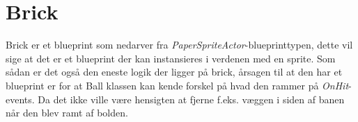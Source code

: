 \section{Brick}
Brick er et blueprint som nedarver fra \textit{PaperSpriteActor}-blueprinttypen, dette vil sige at det er et blueprint der kan instansieres i verdenen med en sprite. Som sådan er det også den eneste logik der ligger på brick, årsagen til at den har et blueprint er for at Ball klassen kan kende forskel på hvad den rammer på \textit{OnHit}-events. Da det ikke ville være hensigten at fjerne f.eks. væggen i siden af banen når den blev ramt af bolden.

